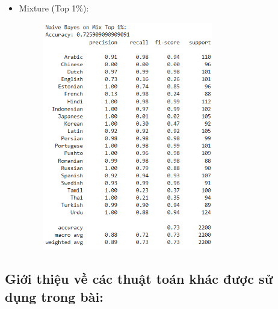 \begin{itemize}
\begin{itemize}
\begin{figure}[H]
\end{figure}
\clearpage
        \item Mixture (Top 1\%):
        \begin{figure}[H]
    \centering
    \includegraphics[width=0.7\textwidth]{img/docspics/Picture45.png}
\end{figure}
\end{itemize}

\end{itemize}
\clearpage
\subsection{Giới thiệu về các thuật toán khác được sử dụng trong bài:}

